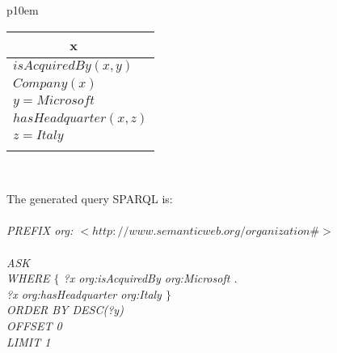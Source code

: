 \begin{enumerate}
\begin{itemize}
\begin{center}
\begin{tabular}{ p{10em} }
	\begin{center}
		\begin{tabular}{|c|l|}
			\hline
			\mbox{} & x \\ 
			\hline
			\multicolumn{2}{|l|}{
			$isAcquiredBy(x,y)$
			}\\
			\multicolumn{2}{|l|}{
			$Company(x)$
			}\\
			\multicolumn{2}{|l|}{
			$y=Microsoft$
			}\\
			\multicolumn{2}{|l|}{
			$hasHeadquarter(x,z)$
			}\\
			\multicolumn{2}{|l|}{
			$z=Italy$
			}\\
			\hline
			\multicolumn{2}{|l|}{
				\mbox{}
			} \\
			\hline
		\end{tabular}
	\end{center}	
	\\
\end{tabular}
\end{center}
\medskip
\end{itemize}
The generated query SPARQL is:
\\
\\
\textit{PREFIX org: $<http://www.semanticweb.org/organization \# >$}
\\
\\
\textit{ASK \\
\mbox{}\qquad WHERE $\{$ ?x org:isAcquiredBy org:Microsoft .\\
\mbox{}\qquad \qquad \qquad ?x org:hasHeadquarter org:Italy
\mbox{}\qquad $\}$ \\
\mbox{}\qquad ORDER BY DESC(?y)\\
\mbox{}\qquad OFFSET 0\\
\mbox{}\qquad LIMIT 1}\\
\\ 

\end{enumerate}